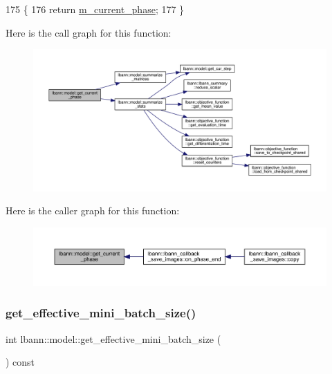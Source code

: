 \begin{DoxyCode}
175                                        \{
176     \textcolor{keywordflow}{return} \hyperlink{classlbann_1_1model_a150ef033f81982936e007b10c421f488}{m\_current\_phase};
177   \}
\end{DoxyCode}
Here is the call graph for this function\+:\nopagebreak
\begin{figure}[H]
\begin{center}
\leavevmode
\includegraphics[width=350pt]{classlbann_1_1model_afd569027be9b7a6adb08f486331384ac_cgraph}
\end{center}
\end{figure}
Here is the caller graph for this function\+:\nopagebreak
\begin{figure}[H]
\begin{center}
\leavevmode
\includegraphics[width=350pt]{classlbann_1_1model_afd569027be9b7a6adb08f486331384ac_icgraph}
\end{center}
\end{figure}
\mbox{\label{classlbann_1_1model_a2a9b4cfa1c8c91e4131908751f9c4a6a}} 
\subsubsection{\texorpdfstring{get\+\_\+effective\+\_\+mini\+\_\+batch\+\_\+size()}{get\_effective\_mini\_batch\_size()}}
{\footnotesize\ttfamily int lbann\+::model\+::get\+\_\+effective\+\_\+mini\+\_\+batch\+\_\+size (\begin{DoxyParamCaption}{ }\end{DoxyParamCaption}) const\hspace{0.3cm}{\ttfamily [inline]}}

